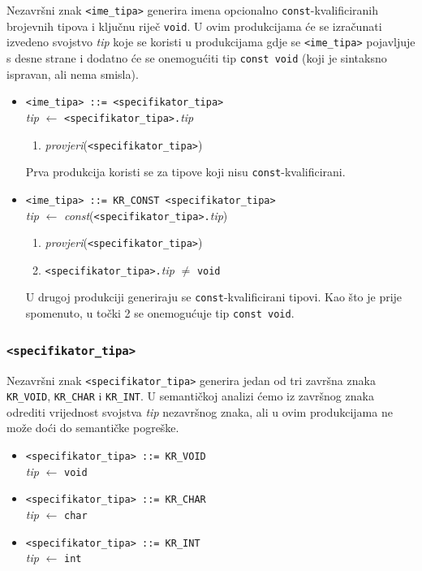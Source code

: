 \documentclass[times, 12pt, utf8]{book}
\begin{document}
Nezavršni znak \verb|<ime_tipa>| generira imena opcionalno \verb|const|-kvalificiranih brojevnih tipova i ključnu riječ \verb|void|.
U ovim produkcijama će se izračunati izvedeno svojstvo \emph{tip} koje se koristi u produkcijama gdje se \verb|<ime_tipa>| pojavljuje s desne strane i dodatno će se onemogućiti tip \verb|const void| (koji je sintaksno ispravan, ali nema smisla).

\begin{itemize}

\item
\verb|<ime_tipa> ::= <specifikator_tipa>|\\
\emph{tip} \(\leftarrow\) \verb|<specifikator_tipa>.|\emph{tip}
\begin{enumerate}
\item
\emph{provjeri}(\verb|<specifikator_tipa>|)
\end{enumerate}

Prva produkcija koristi se za tipove koji nisu \verb|const|-kvalificirani.

\item
\verb|<ime_tipa> ::= KR_CONST <specifikator_tipa>|\\
\emph{tip} \(\leftarrow\) \emph{const}(\verb|<specifikator_tipa>.|\emph{tip})
\begin{enumerate}
\item
\emph{provjeri}(\verb|<specifikator_tipa>|)
\item
\verb|<specifikator_tipa>.|\emph{tip} \(\neq\) \verb|void|
\end{enumerate}

U drugoj produkciji generiraju se \verb|const|-kvalificirani tipovi.
Kao što je prije spomenuto, u točki 2 se onemogućuje tip \verb|const void|.

\end{itemize}

\subsubsection{\texttt{<specifikator\_tipa>}}

Nezavršni znak \verb|<specifikator_tipa>| generira jedan od tri završna znaka \verb|KR_VOID|, \verb|KR_CHAR| i \verb|KR_INT|.
U semantičkoj analizi ćemo iz završnog znaka odrediti vrijednost svojstva \emph{tip} nezavršnog znaka, ali u ovim produkcijama ne može doći do semantičke pogreške.

\begin{itemize}

\item
\verb|<specifikator_tipa> ::= KR_VOID|\\
\emph{tip} \(\leftarrow\) \verb|void|

\item
\verb|<specifikator_tipa> ::= KR_CHAR|\\
\emph{tip} \(\leftarrow\) \verb|char|

\item
\verb|<specifikator_tipa> ::= KR_INT|\\
\emph{tip} \(\leftarrow\) \verb|int|

\end{itemize}
\end{document}
